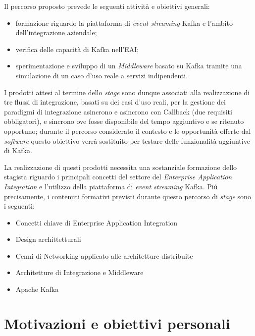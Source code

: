 \bigskip\noindent
Il percorso proposto prevede le seguenti attività e obiettivi generali:
\begin{itemize}
  \item formazione riguardo la piattaforma di \textit{event streaming} Kafka e l'ambito dell'integrazione aziendale;
  \item verifica delle capacità di Kafka nell'EAI;
  \item sperimentazione e sviluppo di un \textit{Middleware} basato su Kafka tramite una simulazione di un caso d'uso reale a servizi indipendenti.
\end{itemize}

\bigskip\noindent
I prodotti attesi al termine dello \textit{stage} sono dunque associati alla realizzazione di tre flussi di integrazione, basati su dei casi d’uso reali, per la gestione dei paradigmi di integrazione asincrono e asincrono con Callback (due requisiti obbligatori), e sincrono ove fosse disponibile del tempo aggiuntivo e se ritenuto opportuno; durante il percorso considerato il contesto e le opportunità offerte dal \textit{software} questo obiettivo verrà sostituito per testare delle funzionalità aggiuntive di Kafka.

La realizzazione di questi prodotti necessita una sostanziale formazione dello stagista riguardo i principali concetti del settore del \textit{Enterprise Application Integration} e l'utilizzo della piattaforma di \textit{event streaming} Kafka.
Più precisamente, i contenuti formativi previsti durante questo percorso di \textit{stage} sono i seguenti:
\begin{itemize}
  \item Concetti chiave di Enterprise Application Integration
  \item Design archittetturali
  \item Cenni di Networking applicato alle architetture distribuite
  \item Architetture di Integrazione e Middleware
  \item Apache Kafka
\end{itemize}


\section{Motivazioni e obiettivi personali}

